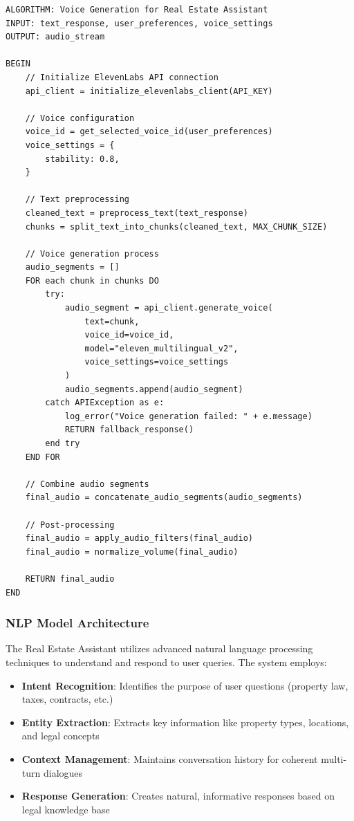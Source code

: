 \begin{verbatim}
ALGORITHM: Voice Generation for Real Estate Assistant
INPUT: text_response, user_preferences, voice_settings
OUTPUT: audio_stream

BEGIN
    // Initialize ElevenLabs API connection
    api_client = initialize_elevenlabs_client(API_KEY)
    
    // Voice configuration
    voice_id = get_selected_voice_id(user_preferences)
    voice_settings = {
        stability: 0.8,
    }
    
    // Text preprocessing
    cleaned_text = preprocess_text(text_response)
    chunks = split_text_into_chunks(cleaned_text, MAX_CHUNK_SIZE)
    
    // Voice generation process
    audio_segments = []
    FOR each chunk in chunks DO
        try:
            audio_segment = api_client.generate_voice(
                text=chunk,
                voice_id=voice_id,
                model="eleven_multilingual_v2",
                voice_settings=voice_settings
            )
            audio_segments.append(audio_segment)
        catch APIException as e:
            log_error("Voice generation failed: " + e.message)
            RETURN fallback_response()
        end try
    END FOR
    
    // Combine audio segments
    final_audio = concatenate_audio_segments(audio_segments)
    
    // Post-processing
    final_audio = apply_audio_filters(final_audio)
    final_audio = normalize_volume(final_audio)
    
    RETURN final_audio
END
\end{verbatim}


\subsubsection{NLP Model Architecture}
The Real Estate Assistant utilizes advanced natural language processing techniques to understand and respond to user queries. The system employs:

\begin{itemize}
    \item \textbf{Intent Recognition}: Identifies the purpose of user questions (property law, taxes, contracts, etc.)
    \item \textbf{Entity Extraction}: Extracts key information like property types, locations, and legal concepts
    \item \textbf{Context Management}: Maintains conversation history for coherent multi-turn dialogues
    \item \textbf{Response Generation}: Creates natural, informative responses based on legal knowledge base
\end{itemize}

